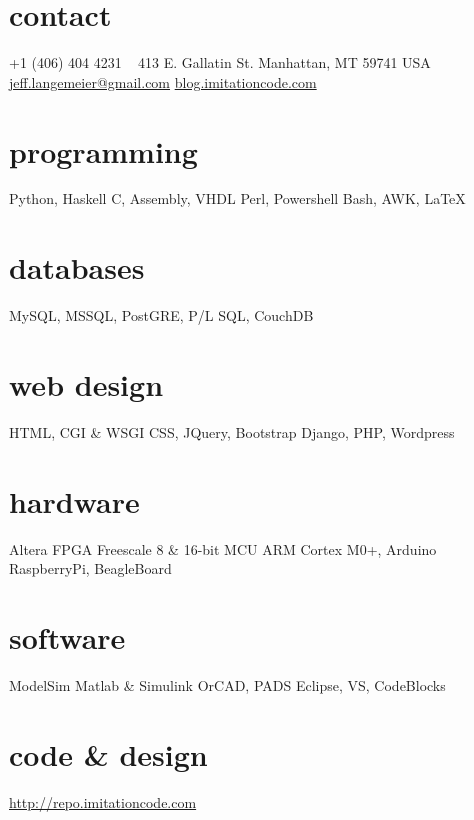\documentclass[]{two-column-stats} %
\begin{document}


\begin{aside} %
\section{contact}
+1 (406) 404 4231
~
413 E. Gallatin St.
Manhattan, MT 59741
USA
~
\href{mailto:jeff.langemeier@gmail.com}{jeff.langemeier@gmail.com}
\href{http://blog.imitationcode.com}{blog.imitationcode.com}
\section{programming}
Python, Haskell
C, Assembly, VHDL
Perl, Powershell
Bash, AWK, \LaTeX
\section{databases}
MySQL, MSSQL, PostGRE,
P/L SQL, CouchDB
\section{web design}
HTML, CGI \& WSGI
CSS, JQuery, Bootstrap
Django, PHP, Wordpress
\section{hardware}
Altera FPGA
Freescale 8 \& 16-bit MCU
ARM Cortex M0+,  Arduino
RaspberryPi, BeagleBoard
\section{software}
ModelSim
Matlab \& Simulink
OrCAD, PADS
Eclipse, VS, CodeBlocks
\section{code \& design}
\href{https://bitbucket.org/jlangemeier/}{http://repo.imitationcode.com}
\end{aside}
\end{document}
